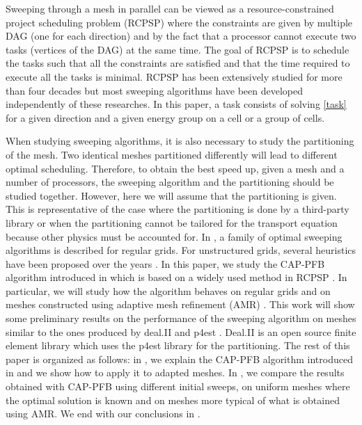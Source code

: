 \documentclass{mc2015}
\renewcommand{\(}{\left(}
\renewcommand{\)}{\right)}
\renewcommand{\[}{\left[}
\renewcommand{\]}{\right]}
\begin{document}
Sweeping through a mesh in parallel can be viewed as a resource-constrained
project scheduling problem (RCPSP) \cite{Brucker1999,Kolisch2006} where the
constraints are given by multiple DAG (one for each direction) and by the fact
that a processor cannot execute two tasks (vertices of the DAG) at the same
time. The goal of RCPSP is to schedule the tasks such that all the constraints are
satisfied and that the time required to execute all the tasks is minimal. 
RCPSP has been extensively studied for more than four decades
\cite{Pritsker1969} but most sweeping algorithms have been developed
independently of these researches. In this paper, a task consists of solving
\cref{task} for a given direction and a given energy group on a cell or a group
of cells.

When studying sweeping algorithms, it is also necessary to study the
partitioning of the mesh. Two identical meshes partitioned differently will lead
to different optimal scheduling. Therefore, to obtain the best speed up, given a
mesh and a number of processors, the sweeping algorithm and the partitioning
should be studied together. However, here we will assume that the
partitioning is given. This is representative of the case where the partitioning
is done by a third-party library or when the partitioning cannot be tailored for
the transport equation because other physics must be accounted for. In
\cite{Adams2013}, a family of optimal sweeping algorithms is described for
regular grids. For unstructured grids, several heuristics have been proposed
over the years
\cite{Pautz2002,Plimpton2005,Yan2013,Colomer2013,Kumar2005,Mo2014}. In this
paper, we study the CAP-PFB algorithm introduced in \cite{Mo2014} which is based
on a widely used method in RCPSP \cite{Li1992}. In particular, we will study how
the algorithm behaves on regular grids and on meshes constructed using adaptive
mesh refinement (AMR)
\cite{Arnold2000,Baker2002,Bangerth2007,Jessee1998,Wang2010a}. This work will
show some preliminary results on the performance of the sweeping algorithm on 
meshes similar to
the ones produced by deal.II \cite{Bangerth2007,Bangerth2013} and p4est
\cite{Burstedde2011}. Deal.II is an open source finite element library which
uses the p4est library for the partitioning. The rest of this paper is organized
as follows: in , we explain the CAP-PFB algorithm
introduced in \cite{Mo2014} and we show how to apply it to adapted meshes. In
, we compare the results obtained with CAP-PFB using different
initial sweeps, on uniform meshes where the optimal solution is known
\cite{Adams2013} and on meshes more typical of what is obtained using AMR.
We end with our conclusions in .
\end{document}
